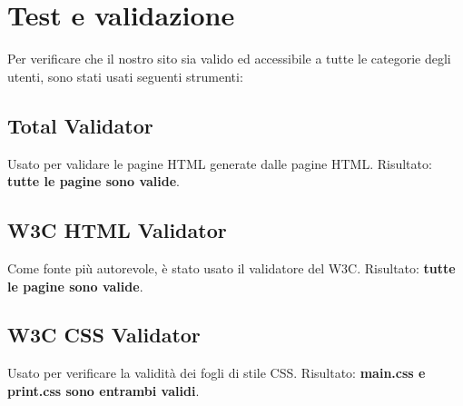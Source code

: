 \documentclass[1_relazione.tex]{subfiles}
\begin{document}
    \section{Test e validazione}\label{sec:test-e-validazione}
    Per verificare che il nostro sito sia valido ed accessibile a tutte le categorie degli utenti, sono stati usati seguenti strumenti:

    \subsection{Total Validator}
    Usato per validare le pagine HTML generate dalle pagine HTML.\newline
    Risultato: \textbf{tutte le pagine sono valide}.
    \subsection{W3C HTML Validator}
    Come fonte pi\`{u} autorevole, \`{e} stato usato il validatore del W3C.\newline
    Risultato: \textbf{tutte le pagine sono valide}.
    \subsection{W3C CSS Validator}
    Usato per verificare la validit\`{a} dei fogli di stile CSS. \newline
    Risultato: \textbf{main.css e print.css sono entrambi validi}.
\end{document}
